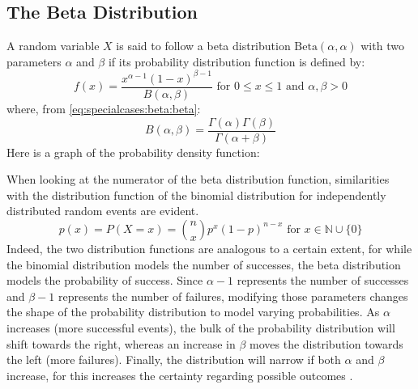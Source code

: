 \documentclass[12pt]{article}
\begin{document}

\pagebreak
\subsection{The Beta Distribution}\label{subsec:specialcases:beta}
A random variable $X$ is said to follow a beta distribution $\text{Beta}(\alpha, \alpha)$ with two parameters $\alpha$
and $\beta$ if its probability distribution function is defined by:
\begin{equation}\label{eq:specialcases:beta:pdf}
	f(x) = \frac{x^{\alpha-1} (1-x)^{\beta-1}}{B(\alpha, \beta)}\text{ for } 0\leq x\leq 1\text{ and }\alpha, \beta > 0
\end{equation}
where, from \autoref{eq:specialcases:beta:beta}:
\begin{equation}
	B(\alpha, \beta) = \frac{\Gamma(\alpha)\Gamma(\beta)}{\Gamma(\alpha+\beta)}
\end{equation}
 Here is a graph of the probability density function:


\pagebreak
When looking at the numerator of the beta distribution function, similarities with the distribution function of the
binomial distribution for independently distributed random events are evident.
\begin{equation}
	p(x) = P(X=x) =\binom{n}{x}p^x(1-p)^{n-x}\text{ for }x\in\mathbb{N}\cup\{0\}
\end{equation}
Indeed, the two distribution functions are analogous to a certain extent, for while the binomial distribution models the
number of successes, the beta distribution models the probability of success. Since $\alpha-1$ represents the number
of successes and $\beta-1$ represents the number of failures, modifying those parameters changes the shape of the
probability distribution to model varying probabilities. As $\alpha$ increases (more successful events), the bulk of the
probability distribution will shift towards the right, whereas an increase in $\beta$ moves the distribution towards the
left (more failures). Finally, the distribution will narrow if both $\alpha$ and $\beta$ increase, for this increases the
certainty regarding possible outcomes \cite{kimBetaDistributionIntuition2020, disorboBetaGamma}.
\end{document}
